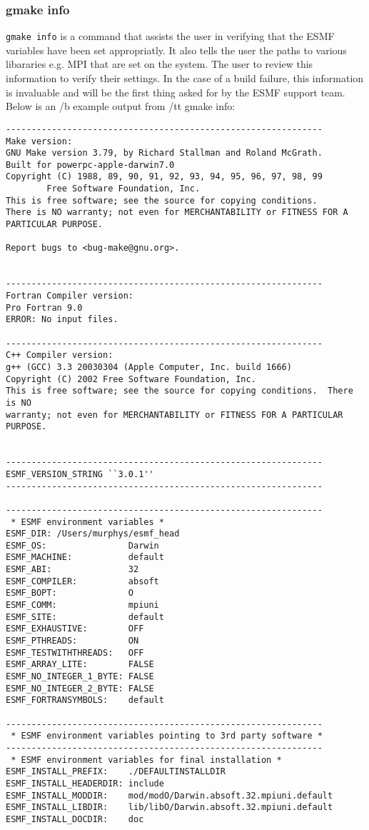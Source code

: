\subsubsection{gmake info}
{\tt gmake info} is a command that assists the user in verifying that the ESMF 
variables have been set appropriatly.
It also tells the user the paths to various libararies e.g. MPI that are set on the system.  The user to review this
information to verify their settings. In the case of a build failure, this information is invaluable and will be the
first thing asked for by the ESMF support team. Below is an {/b example output} from {/tt gmake info}:  
\begin{verbatim}
--------------------------------------------------------------
Make version:
GNU Make version 3.79, by Richard Stallman and Roland McGrath.
Built for powerpc-apple-darwin7.0
Copyright (C) 1988, 89, 90, 91, 92, 93, 94, 95, 96, 97, 98, 99
        Free Software Foundation, Inc.
This is free software; see the source for copying conditions.
There is NO warranty; not even for MERCHANTABILITY or FITNESS FOR A
PARTICULAR PURPOSE.

Report bugs to <bug-make@gnu.org>.


--------------------------------------------------------------
Fortran Compiler version:
Pro Fortran 9.0
ERROR: No input files.

--------------------------------------------------------------
C++ Compiler version:
g++ (GCC) 3.3 20030304 (Apple Computer, Inc. build 1666)
Copyright (C) 2002 Free Software Foundation, Inc.
This is free software; see the source for copying conditions.  There is NO
warranty; not even for MERCHANTABILITY or FITNESS FOR A PARTICULAR PURPOSE.


--------------------------------------------------------------
ESMF_VERSION_STRING ``3.0.1''
--------------------------------------------------------------

--------------------------------------------------------------
 * ESMF environment variables *
ESMF_DIR: /Users/murphys/esmf_head
ESMF_OS:                Darwin
ESMF_MACHINE:           default
ESMF_ABI:               32
ESMF_COMPILER:          absoft
ESMF_BOPT:              O
ESMF_COMM:              mpiuni
ESMF_SITE:              default
ESMF_EXHAUSTIVE:        OFF
ESMF_PTHREADS:          ON
ESMF_TESTWITHTHREADS:   OFF
ESMF_ARRAY_LITE:        FALSE
ESMF_NO_INTEGER_1_BYTE: FALSE
ESMF_NO_INTEGER_2_BYTE: FALSE
ESMF_FORTRANSYMBOLS:    default

--------------------------------------------------------------
 * ESMF environment variables pointing to 3rd party software *
--------------------------------------------------------------
 * ESMF environment variables for final installation *
ESMF_INSTALL_PREFIX:    ./DEFAULTINSTALLDIR
ESMF_INSTALL_HEADERDIR: include
ESMF_INSTALL_MODDIR:    mod/modO/Darwin.absoft.32.mpiuni.default
ESMF_INSTALL_LIBDIR:    lib/libO/Darwin.absoft.32.mpiuni.default
ESMF_INSTALL_DOCDIR:    doc



\end{verbatim}
